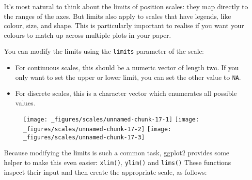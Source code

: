 It's most natural to think about the limits of position scales: they map
directly to the ranges of the axes. But limits also apply to scales that
have legends, like colour, size, and shape. This is particularly
important to realise if you want your colours to match up across
multiple plots in your paper.

You can modify the limits using the \texttt{limits} parameter of the
scale:

\begin{itemize}
\item
  For continuous scales, this should be a numeric vector of length two.
  If you only want to set the upper or lower limit, you can set the
  other value to \texttt{NA}.
\item
  For discrete scales, this is a character vector which enumerates all
  possible values.
\end{itemize}

\begin{Shaded}
\begin{Highlighting}[]
\StringTok{ }\NormalTok{(} \OperatorTok{:}\NormalTok{, } \OperatorTok{:}\NormalTok{)}
\StringTok{ }\OperatorTok{+}\StringTok{ }\NormalTok{() }

\OperatorTok{+}\StringTok{ }\NormalTok{(} \NormalTok{(}\NormalTok{, }\NormalTok{))}
\OperatorTok{+}\StringTok{ }\NormalTok{(} \NormalTok{(}\NormalTok{, }\NormalTok{))}
\end{Highlighting}
\end{Shaded}

\begin{figure}[H]
  \texttt{[image: \_figures/scales/unnamed-chunk-17-1]}%
  \texttt{[image: \_figures/scales/unnamed-chunk-17-2]}%
  \texttt{[image: \_figures/scales/unnamed-chunk-17-3]}
\end{figure}

Because modifying the limits is such a common task, ggplot2 provides
some helper to make this even easier: \texttt{xlim()}, \texttt{ylim()}
and \texttt{lims()} These functions inspect their input and then create
the appropriate scale, as follows:  

